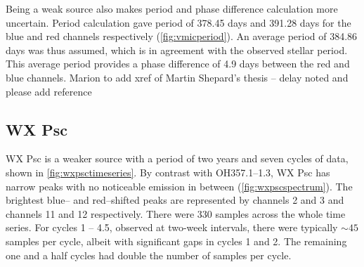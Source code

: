 Being a weak source also makes period and phase difference calculation more uncertain.
Period calculation gave period of 378.45 days and 391.28 days for the blue and red channels respectively (\cref{fig:vmicperiod}).
An average period of 384.86 days was thus assumed, which is in agreement with the observed stellar period.
This average period provides a phase difference of 4.9 days between the red and blue channels.
{\color {red}
Marion to add xref of Martin Shepard's thesis -- delay noted and please add reference
}


\subsection*{WX Psc}
{\color{gray}
WX Psc is a weaker source with a period of two years and seven cycles of data, shown in \cref{fig:wxpsctimeseries}.
By contrast with OH357.1--1.3, WX Psc has narrow peaks with no noticeable emission in between (\cref{fig:wxpscspectrum}).
The brightest blue-- and red--shifted peaks are represented by channels 2 and 3 and channels 11 and 12 respectively.
There were 330 samples across the whole time series.
For cycles 1 -- 4.5, observed at two-week intervals, there were typically $\sim45$ samples per cycle, albeit with significant gaps in cycles 1 and 2.
The remaining one and a half cycles had double the number of samples per cycle.
}


